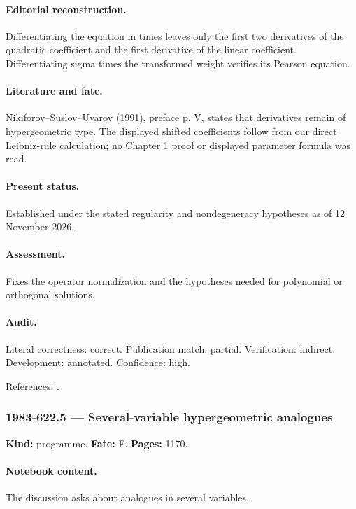 \paragraph{Editorial reconstruction.} Differentiating the equation m times leaves only the first two derivatives of the quadratic coefficient and the first derivative of the linear coefficient. Differentiating sigma times the transformed weight verifies its Pearson equation.

\paragraph{Literature and fate.} Nikiforov–Suslov–Uvarov (1991), preface p. V, states that derivatives remain of hypergeometric type. The displayed shifted coefficients follow from our direct Leibniz-rule calculation; no Chapter 1 proof or displayed parameter formula was read.

\paragraph{Present status.} Established under the stated regularity and nondegeneracy hypotheses as of 12 November 2026.

\paragraph{Assessment.} Fixes the operator normalization and the hypotheses needed for polynomial or orthogonal solutions.

\paragraph{Audit.} Literal correctness: correct. Publication match: partial. Verification: indirect. Development: annotated. Confidence: high.

\noindent References: \citep{nikiforovsuslovuvarov1991classical}.\par

\subsubsection{1983-622.5 --- Several-variable hypergeometric analogues}

\label{item:1983-622.5}

\noindent\textbf{Kind:} programme. \textbf{Fate:} F. \textbf{Pages:} 1170.\par

\paragraph{Notebook content.} The discussion asks about analogues in several variables.

